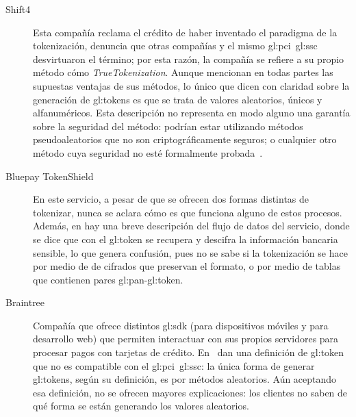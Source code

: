 \begin{description}

  \item[Shift4]
    Esta compañía reclama el crédito de haber inventado el paradigma de
    la tokenización, denuncia que otras compañías y el mismo
    \gls{gl:pci}~\gls{gl:ssc} desvirtuaron el término; por esta razón, la
    compañía se refiere a su propio método cómo \textit{TrueTokenization}.
    Aunque mencionan en todas partes las supuestas ventajas de sus métodos,
    lo único que dicen con claridad sobre la generación de \glspl{gl:token} es
    que se trata de valores aleatorios, únicos y alfanuméricos. Esta descripción
    no representa en modo alguno una garantía sobre la seguridad del
    método: podrían estar utilizando métodos pseudoaleatorios que no son
    criptográficamente seguros; o cualquier otro método cuya seguridad no esté
    formalmente probada~\cite{shif4_uno, shif4_dos}.

  \item[Bluepay TokenShield]
    En este servicio, a pesar de que se ofrecen dos formas distintas de
    tokenizar, nunca se aclara cómo es que funciona alguno de estos procesos.
    Además, en \cite{bluepay_tokenshield} hay una breve descripción del flujo
    de datos del servicio, donde se dice que con el \gls{gl:token} se recupera
    y descifra la información bancaria sensible, lo que genera confusión, pues
    no se sabe si la tokenización se hace por medio de de cifrados que
    preservan el formato\footnotemark, o por medio de tablas que
    contienen pares \gls{gl:pan}-\gls{gl:token}.


  \item[Braintree]
    Compañía que ofrece distintos \gls{gl:sdk} (para dispositivos móviles y
    para desarrollo web) que permiten interactuar con sus propios servidores
    para procesar pagos con tarjetas de crédito. En~\cite{braintree_uno}
    dan una definición de \gls{gl:token} que no es compatible con el
    \gls{gl:pci}~\gls{gl:ssc}: la única forma de generar \glspl{gl:token},
    según su definición, es por métodos aleatorios. Aún aceptando
    esa definición, no se ofrecen mayores explicaciones: los clientes no
    saben de qué forma se están generando los valores aleatorios.


\end{description}
